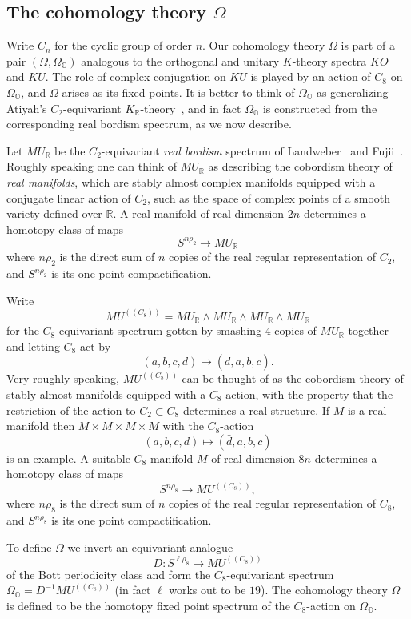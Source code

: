 \documentclass{amsart}
\theoremstyle{definition}
\theoremstyle{remark}
\newcommand{\R}{{\mathbb R}}
\newcommand{\mur}{MU_{\R}}
\newcommand{\mutn}[1]{MU^{(\!(#1)\!)}}
\newcommand{\zt}{C_{2}}
\newcommand{\ze}{C_{8}}
\newcommand{\D}{D} %
\newcommand{\magic}{\Omega}
\newcommand{\premagic}{\Omega_{\mathbb{O}}}
\begin{document}
\subsection{The cohomology theory $\magic$}
\label{sec:cohom-theory-omega}

Write $C_{n}$ for the cyclic group of order $n$.  Our cohomology
theory $\magic$ is part of a pair $(\magic,\premagic)$ analogous to
the orthogonal and unitary $K$-theory spectra $KO$ and $KU$.  The role
of complex conjugation on $KU$ is played by an action of $\ze$ on
$\premagic$, and $\magic$ arises as its fixed points.  It is better to
think of $\premagic$ as generalizing Atiyah's $\zt$-equivariant
$K_{\R}$-theory~\cite{atiyah66:_k}, and in fact $\premagic$ is
constructed from the corresponding real bordism spectrum, as we now
describe.

Let $\mur$ be the $\zt$-equivariant {\em real bordism} spectrum of
Landweber~\cite{MR0222890} and Fujii~\cite{MR0420597}. Roughly
speaking one can think of $\mur$ as describing the cobordism theory of
{\em real manifolds}, which are stably almost complex manifolds
equipped with a conjugate linear action of $\zt$, such as the space of
complex points of a smooth variety defined over $\R$.  A real manifold
of real dimension $2n$ determines a homotopy class of maps
\[
S^{n\rho_{2}}\to \mur
\]
where $n\rho_{2}$ is the direct sum of $n$ copies of the real regular
representation of $\zt$, and $S^{n\rho_{2}}$ is its one point
compactification.  

Write
\[
\mutn{\ze}=\mur\wedge\mur\wedge\mur\wedge\mur
\]
for the $\ze$-equivariant spectrum gotten by smashing $4$ copies of
$\mur$ together and letting $\ze$ act by
\[
(a,b,c,d)\mapsto (\bar{d},a,b,c).
\]
Very roughly speaking, $\mutn{\ze}$ can be thought of as the cobordism theory
of stably almost manifolds equipped with a $\ze$-action, with the
property that the restriction of the action to $\zt\subset \ze$
determines a real structure.   If $M$ is a real manifold
then $M\times M\times M\times M$ with the $\ze$-action 
\[
(a,b,c,d) \mapsto (\bar d, a,b,c)
\]
is an example.   A suitable $\ze$-manifold $M$ of real dimension $8n$
determines a homotopy class of maps 
\[
S^{n\rho_{8}}\to \mutn{\ze},
\]
where $n\rho_{8}$ is the direct sum of $n$ copies of the real regular
representation of $\ze$, and $S^{n\rho_{8}}$ is its one point
compactification.  

To define $\magic$ we invert an 
equivariant analogue 
\[
\D:S^{\ell\rho_{8}}\to \mutn{\ze}
\]
of the Bott periodicity class and form the $\ze$-equivariant spectrum
$\premagic=\D^{-1}\mutn{\ze}$ (in fact $\ell$ works out to be $19$).
The cohomology theory $\magic$ is defined to be the homotopy fixed
point spectrum of the $\ze$-action on $\premagic$.
\end{document}

